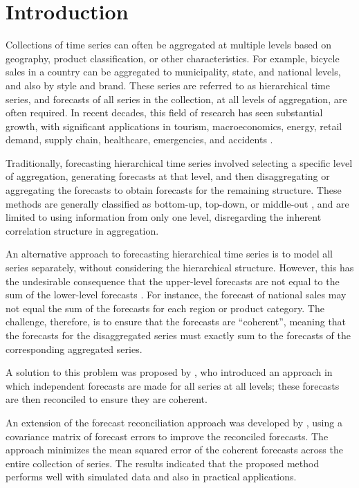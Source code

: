 \documentclass[a4paper,preprint,11pt,authoryear]{elsarticle}
\begin{document}
\section{Introduction}

Collections of time series can often be aggregated at multiple levels based on geography, product classification, or other characteristics. For example, bicycle sales in a country can be aggregated to municipality, state, and national levels, and also by style and brand. These series are referred to as hierarchical time series, and forecasts of all series in the collection, at all levels of aggregation, are often required. In recent decades, this field of research has seen substantial growth, with significant applications in tourism, macroeconomics, energy, retail demand, supply chain, healthcare, emergencies, and accidents \citep{athanasopoulos2023forecast}.

Traditionally, forecasting hierarchical time series involved selecting a specific level of aggregation, generating forecasts at that level, and then disaggregating or aggregating the forecasts to obtain forecasts for the remaining structure. These methods are generally classified as bottom-up, top-down, or middle-out \citep{athanasopoulos2023forecast}, and are limited to using information from only one level, disregarding the inherent correlation structure in aggregation.

An alternative approach to forecasting hierarchical time series is to model all series separately, without considering the hierarchical structure. However, this has the undesirable consequence that the upper-level forecasts are not equal to the sum of the lower-level forecasts \citep{hyndman2011optimal}. For instance, the forecast of national sales may not equal the sum of the forecasts for each region or product category. The challenge, therefore, is to ensure that the forecasts are ``coherent'', meaning that the forecasts for the disaggregated series must exactly sum to the forecasts of the corresponding aggregated series.

A solution to this problem was proposed by \citet{hyndman2011optimal}, who introduced an approach in which independent forecasts are made for all series at all levels; these forecasts are then reconciled to ensure they are coherent.

An extension of the forecast reconciliation approach was developed by \citet{wickramasuriya2019optimal}, using a covariance matrix of forecast errors to improve the reconciled forecasts. The approach minimizes the mean squared error of the coherent forecasts across the entire collection of series. The results indicated that the proposed method performs well with simulated data and also in practical applications.
\end{document}
